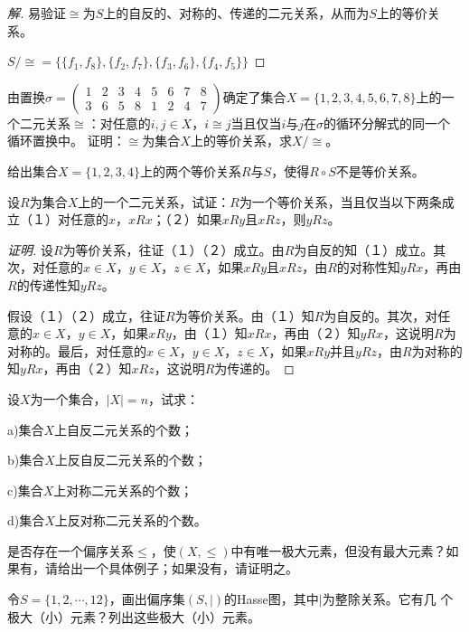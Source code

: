 \documentclass{article}
\begin{document}
\begin{CJK}{UTF8}{gbsn}
\begin{proof}[解]
      易验证$\cong$为$S$上的自反的、对称的、传递的二元关系，从而为$S$上的等价关系。

  $S/\cong=\{\{f_1,f_8\},\{f_2,f_7\},\{f_3,f_6\},\{f_4,f_5\}\}$
\end{proof}


\begin{Exercise}
由置换$\sigma=\begin{pmatrix}1&2&3&4&5&6&7&8\\3&6&5&8&1&2&4&7\end{pmatrix}$确定了集合$X=\{1,2,3,4,5,6,7,8\}$上的一个二元关系$\cong$：对任意的$i,j\in X$，$i\cong j$当且仅当$i$与$j$在$\sigma$的循环分解式的同一个循环置换中。
证明：$\cong$为集合$X$上的等价关系，求$X/\cong$。
\end{Exercise}
\vspace{5cm}
\begin{Exercise}
 给出集合$X=\{1,2,3,4\}$上的两个等价关系$R$与$S$，使得$R\circ S$不是等价关系。
\end{Exercise}
\vspace{10cm}
\begin{Exercise}
  设$R$为集合$X$上的一个二元关系，试证：$R$为一个等价关系，当且仅当以下两条成立（１）对任意的$x$，$xRx$；（２）如果$xRy$且$xRz$，则$yRz$。
\end{Exercise}
\begin{proof}[证明]

  设$R$为等价关系，往证（１）（２）成立。由$R$为自反的知（１）成立。其次，对任意的$x\in X$，$y\in X$，$z\in X$，如果$xRy$且$xRz$，由$R$的对称性知$yRx$，再由$R$的传递性知$yRz$。

  假设（１）（２）成立，往证$R$为等价关系。由（１）知$R$为自反的。其次，对任意的$x\in X$，$y\in X$，如果$xRy$，由（１）知$xRx$，再由（２）知$yRx$，这说明$R$为对称的。最后，对任意的$x\in X$，$y\in X$，$z\in X$，如果$xRy$并且$yRz$，由$R$为对称的知$yRx$，再由（２）知$xRz$，这说明$R$为传递的。
  
\end{proof}


\begin{Exercise}
  设$X$为一个集合，$|X|=n$，试求：

  a)集合$X$上自反二元关系的个数；

  b)集合$X$上反自反二元关系的个数；

  c)集合$X$上对称二元关系的个数；

  d)集合$X$上反对称二元关系的个数。
\end{Exercise}
\vspace{10cm}
\begin{Exercise}
  是否存在一个偏序关系$\leq$，使$(X,\leq)$中有唯一极大元素，但没有最大元素？如果有，请给出一个具体例子；如果没有，请证明之。
\end{Exercise}
\vspace{5cm}
\begin{Exercise}
  令$S=\{1,2,\cdots,12\}$，画出偏序集$(S,|)$的Hasse图，其中$|$为整除关系。它有几
  个极大（小）元素？列出这些极大（小）元素。
\end{Exercise}
\end{CJK}
\end{document}
